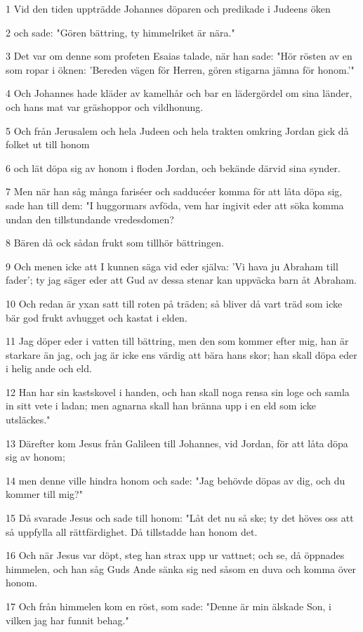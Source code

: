 \par 1 Vid den tiden uppträdde Johannes döparen och predikade i Judeens öken
\par 2 och sade: "Gören bättring, ty himmelriket är nära."
\par 3 Det var om denne som profeten Esaias talade, när han sade: "Hör rösten av en som ropar i öknen: 'Bereden vägen för Herren, gören stigarna jämna för honom.'"
\par 4 Och Johannes hade kläder av kamelhår och bar en lädergördel om sina länder, och hans mat var gräshoppor och vildhonung.
\par 5 Och från Jerusalem och hela Judeen och hela trakten omkring Jordan gick då folket ut till honom
\par 6 och lät döpa sig av honom i floden Jordan, och bekände därvid sina synder.
\par 7 Men när han såg många fariséer och sadducéer komma för att låta döpa sig, sade han till dem: "I huggormars avföda, vem har ingivit eder att söka komma undan den tillstundande vredesdomen?
\par 8 Bären då ock sådan frukt som tillhör bättringen.
\par 9 Och menen icke att I kunnen säga vid eder själva: 'Vi hava ju Abraham till fader'; ty jag säger eder att Gud av dessa stenar kan uppväcka barn åt Abraham.
\par 10 Och redan är yxan satt till roten på träden; så bliver då vart träd som icke bär god frukt avhugget och kastat i elden.
\par 11 Jag döper eder i vatten till bättring, men den som kommer efter mig, han är starkare än jag, och jag är icke ens värdig att bära hans skor; han skall döpa eder i helig ande och eld.
\par 12 Han har sin kastskovel i handen, och han skall noga rensa sin loge och samla in sitt vete i ladan; men agnarna skall han bränna upp i en eld som icke utsläckes."
\par 13 Därefter kom Jesus från Galileen till Johannes, vid Jordan, för att låta döpa sig av honom;
\par 14 men denne ville hindra honom och sade: "Jag behövde döpas av dig, och du kommer till mig?"
\par 15 Då svarade Jesus och sade till honom: "Låt det nu så ske; ty det höves oss att så uppfylla all rättfärdighet. Då tillstadde han honom det.
\par 16 Och när Jesus var döpt, steg han strax upp ur vattnet; och se, då öppnades himmelen, och han såg Guds Ande sänka sig ned såsom en duva och komma över honom.
\par 17 Och från himmelen kom en röst, som sade: "Denne är min älskade Son, i vilken jag har funnit behag."

